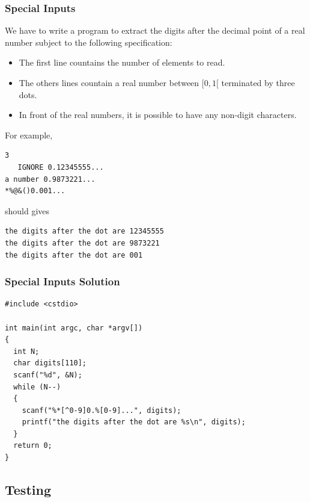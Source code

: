 \documentclass{beamer}
\begin{document}
\begin{frame}[fragile]
\frametitle{Special Inputs}
\scriptsize

We have to write a program to extract the digits after the decimal point of a real number subject to the following specification:\\
\begin{itemize}

\item The first line countains the number of elements to read.

\item<2-> The others lines countain a real number between $[0, 1[$ terminated by three dots.

\item<3-> In front of the real numbers, it is possible to have any non-digit characters.

\end{itemize}


For example,

\begin{verbatim}
3
   IGNORE 0.12345555...
a number 0.9873221...
*%@&()0.001...
\end{verbatim}

should gives

\begin{verbatim}
the digits after the dot are 12345555
the digits after the dot are 9873221
the digits after the dot are 001
\end{verbatim}

\end{frame}

\begin{frame}[containsverbatim]
\frametitle{Special Inputs Solution}
\scriptsize

\begin{lstlisting}
#include <cstdio>

int main(int argc, char *argv[])
{
  int N;
  char digits[110];
  scanf("%d", &N);
  while (N--)
  {
    scanf("%*[^0-9]0.%[0-9]...", digits);
    printf("the digits after the dot are %s\n", digits);
  }
  return 0;
}
\end{lstlisting}

\end{frame}

\subsection{Testing}
\end{document}
